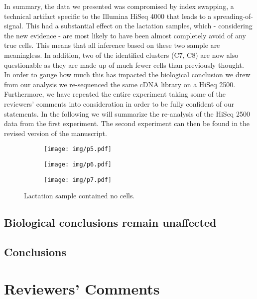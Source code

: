 \documentclass{article}
\begin{document}
In summary, the data we presented was compromised by index swapping, a technical artifact specific to the Illumina HiSeq 4000 that leads to a spreading-of-signal.
This had a substantial effect on the lactation samples, which - considering the new evidence - are most likely to have been almost completely avoid of any true cells.
This means that all inference based on these two sample are meaningless. 
In addition, two of the identified clusters (C7, C8) are now also questionable as they are made up of much fewer cells than previously thought.\\
In order to gauge how much this has impacted the biological conclusion we drew from our analysis we re-sequenced the same cDNA library on a HiSeq 2500.
Furthermore, we have repeated the entire experiment taking some of the reviewers' comments into consideration in order to be fully confident of our statements.
In the following we will summarize the re-analysis of the HiSeq 2500 data from the first experiment.
The second experiment can then be found in the revised version of the manuscript.




\begin{figure}
    \begin{subfigure}[c]{0.5\textwidth}
	\texttt{[image: img/p5.pdf]}
    \caption{}
    \end{subfigure}
    \begin{subfigure}[c]{0.5\textwidth}
	\texttt{[image: img/p6.pdf]}
    \caption{}
    \end{subfigure}
    \begin{subfigure}[c]{0.5\textwidth}
	\texttt{[image: img/p7.pdf]}
    \caption{}
    \end{subfigure}
    \caption{Lactation sample contained no cells.
    }
    \label{F3}
\end{figure}

\subsection*{Biological conclusions remain unaffected}
\subsection*{Conclusions}
\newpage
\section*{Reviewers' Comments}
\end{document}
